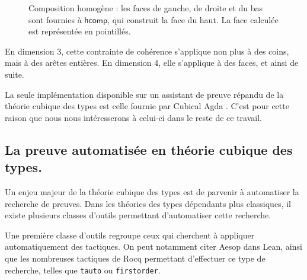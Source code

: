 \documentclass[11pt]{article}
\begin{document}
\begin{figure}[htbp]

\caption{Composition homogène : les faces de gauche, de droite et du bas sont fournies à $\mathsf{hcomp}$, qui construit la face du haut. La face calculée est représentée en pointillés.}
\label{fig:hcomp}

\end{figure}

En dimension 3, cette contrainte de cohérence s’applique non plus à des coins, mais à des arêtes entières.
En dimension 4, elle s’applique à des faces, et ainsi de suite.

La seule implémentation disponible sur un assistant de preuve répandu de la théorie cubique des types est celle fournie par Cubical Agda \cite{vezzosi2019cubical}.
C'est pour cette raison que nous nous intéresserons à celui-ci dans le reste de ce travail.


\subsection{La preuve automatisée en théorie cubique des types.}
Un enjeu majeur de la théorie cubique des types est de parvenir à automatiser la recherche de preuves. 
Dans les théories des types dépendants plus classiques, il existe plusieurs classes d’outils permettant d’automatiser cette recherche.

Une première classe d’outils regroupe ceux qui cherchent à appliquer automatiquement des tactiques. 
On peut notamment citer Aesop \cite{limpberg2023aesop} dans Lean, ainsi que les nombreuses tactiques de Rocq permettant d’effectuer ce type de recherche, 
telles que \texttt{tauto} ou \texttt{firstorder}.
\end{document}

